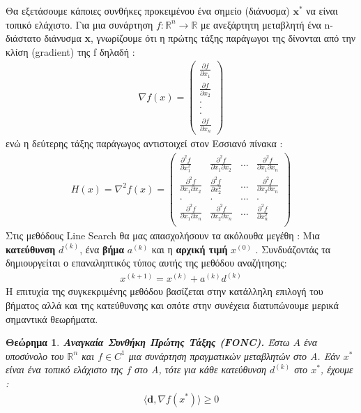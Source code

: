 \documentclass[a4paper,12pt,twoside]{report}
\theoremstyle{plain}
\newtheorem{thm}{Θεώρημα}[section] %
\theoremstyle{definition}
\theoremstyle{remark}
\begin{document}
Θα εξετάσουμε κάποιες συνθήκες προκειμένου ένα σημείο (διάνυσμα) $\textbf{x}^*$ να είναι τοπικό ελάχιστο. Για μια συνάρτηση $f:\mathbb{R}^n\rightarrow \mathbb{R}$ με ανεξάρτητη μεταβλητή ένα n-διάστατο διάνυσμα \textbf{x}, γνωρίζουμε ότι η πρώτης τάξης παράγωγοι της δίνονται από την κλίση (gradient) της f δηλαδή :
\begin{align}
\nabla f(x) = 
\begin{pmatrix}
\frac{\partial f}{\partial x_1}\\
\frac{\partial f}{\partial x_2}\\
.\\
.\\
.\\
\frac{\partial f}{\partial x_n}
\end{pmatrix}
\end{align}
ενώ η δεύτερης τάξης παράγωγος αντιστοιχεί στον Εσσιανό πίνακα :
\begin{align}
H(x) = \nabla ^2f(x) = 
\begin{pmatrix}
\frac{\partial ^2f}{\partial x_1^2} & \frac{\partial ^2f}{\partial x_1\partial x_2} & ... & \frac{\partial ^2f}{\partial x_1\partial x_n}\\
\frac{\partial ^2f}{\partial x_1\partial x_2} & \frac{\partial ^2f}{\partial x_2^2} & ... & \frac{\partial ^2f}{\partial x_2\partial x_n}\\
. & . & ... & .\\
\frac{\partial ^2f}{\partial x_1\partial x_n} & \frac{\partial ^2f}{\partial x_2\partial x_n} & ... & \frac{\partial ^2f}{\partial x_n^2}\\
\end{pmatrix}
\end{align}
Στις μεθόδους Line Search θα μας απασχολήσουν τα ακόλουθα μεγέθη : Μια \textbf{κατεύθυνση} $d^{(k)}$, ένα \textbf{βήμα} $a^{(k)}$ και η \textbf{αρχική τιμή} $x^{(0)}$ . Συνδυάζοντάς τα δημιουργείται ο επαναληπτικός τύπος αυτής της μεθόδου αναζήτησης:
\begin{align}
x^{(k+1)} = x^{(k)} + a^{(k)}d^{(k)}
\end{align}
Η επιτυχία της συγκεκριμένης μεθόδου βασίζεται στην κατάλληλη επιλογή του βήματος αλλά και της κατεύθυνσης και οπότε στην συνέχεια διατυπώνουμε μερικά σημαντικά θεωρήματα.


\begin{thm}{\textbf{Αναγκαία Συνθήκη Πρώτης Τάξης (FONC).}}
      Έστω $A$ ένα υποσύνολο του $\mathbb{R}^n$ και $f\in C^1$ μια συνάρτηση πραγματικών μεταβλητών στο Α. Εάν $x^*$ είναι ένα τοπικό ελάχιστο της $f$ στο Α, τότε για κάθε κατεύθυνση $d^{(k)}$ στο $x^*$, έχουμε :
    \begin{align}\label{FONC}
	    \langle \textbf{d},\nabla f(x^*)\rangle \geq 0
    \end{align}
\end{thm}
\end{document}
